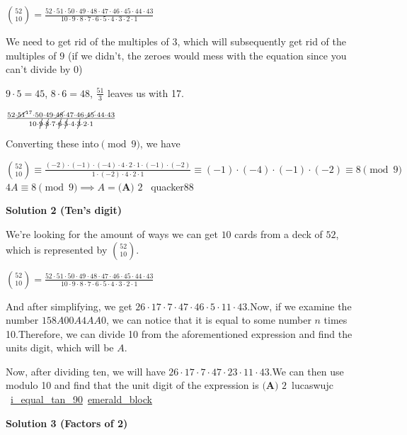 \begin{enumerate}
 $\binom{52}{10}=\frac{52\cdot51\cdot50\cdot49\cdot48\cdot47\cdot46\cdot45\cdot44\cdot43}{10\cdot9\cdot8\cdot7\cdot6\cdot5\cdot4\cdot3\cdot2\cdot1}$

 We need to get rid of the multiples of $3$, which will subsequently get rid of the multiples of $9$ (if we didn't, the zeroes would mess with the equation since you can't divide by 0)

 $9\cdot5=45$, $8\cdot6=48$, $\frac{51}{3}$ leaves us with 17.

 $\frac{52\cdot\cancel{51}^{17}\cdot50\cdot49\cdot\cancel{48}\cdot47\cdot46\cdot\cancel{45}\cdot44\cdot43}{10\cdot\cancel{9}\cdot\cancel{8}\cdot7\cdot\cancel{6}\cdot\cancel{5}\cdot4\cdot\cancel{3}\cdot2\cdot1}$

 Converting these into$\pmod{9}$, we have

 $\binom{52}{10}\equiv \frac{(-2)\cdot(-1)\cdot(-4)\cdot4\cdot2\cdot1\cdot(-1)\cdot(-2)}{1\cdot(-2)\cdot4\cdot2\cdot1} \equiv (-1)\cdot(-4)\cdot(-1)\cdot(-2) \equiv 8 \pmod{9}$
$4A\equiv8\pmod{9} \implies A=\boxed{\textbf{(A) }2}$ ~quacker88

 



\textbf{Solution 2 (Ten's digit)}

We're looking for the amount of ways we can get $10$ cards from a deck of $52$, which is represented by $\binom{52}{10}$.

 $\binom{52}{10}=\frac{52\cdot51\cdot50\cdot49\cdot48\cdot47\cdot46\cdot45\cdot44\cdot43}{10\cdot9\cdot8\cdot7\cdot6\cdot5\cdot4\cdot3\cdot2\cdot1}$

 And after simplifying, we get $26\cdot17\cdot7\cdot47\cdot46\cdot5\cdot11\cdot43$.Now, if we examine the number $158A00A4AA0$, we can notice that it is equal to some number $n$ times 10.Therefore, we can divide 10 from the aforementioned expression and find the units digit, which will be $A$.

 Now, after dividing ten, we will have $26\cdot17\cdot7\cdot47\cdot23\cdot11\cdot43$.We can then use modulo 10 and find that the unit digit of the expression is $\boxed{\textbf{(A) }2}$~lucaswujc ~\href{https://artofproblemsolving.com/wiki/index.php?title=User:I\_equal\_tan\_90&action=edit&redlink=1}{i\_equal\_tan\_90}~\href{https://artofproblemsolving.com/wiki/index.php?title=User:Emerald\_block}{emerald\_block}

 



\textbf{Solution 3 (Factors of 2)}


\end{enumerate}
